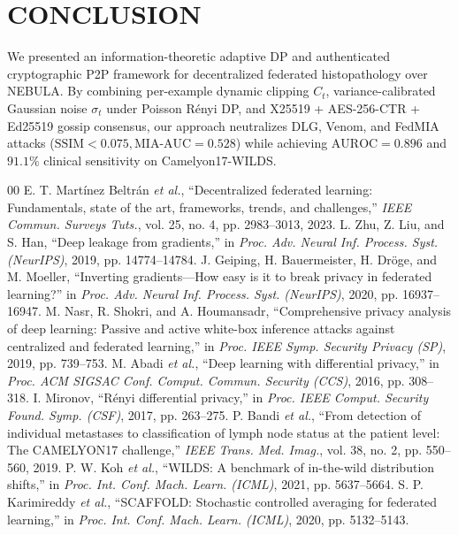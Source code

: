 \documentclass{ieeeaccess}
\begin{document}
\section{CONCLUSION}
We presented an information-theoretic adaptive DP and authenticated cryptographic P2P framework for decentralized federated histopathology over NEBULA. By combining per-example dynamic clipping $C_t$, variance-calibrated Gaussian noise $\sigma_t$ under Poisson R\'enyi DP, and X25519 + AES-256-CTR + Ed25519 gossip consensus, our approach neutralizes DLG, Venom, and FedMIA attacks ($\text{SSIM} < 0.075, \text{MIA-AUC} = 0.528$) while achieving $\text{AUROC} = 0.896$ and $91.1\%$ clinical sensitivity on Camelyon17-WILDS.

\begin{thebibliography}{00}
 E. T. Mart\'inez Beltr\'an \emph{et al.}, ``Decentralized federated learning: Fundamentals, state of the art, frameworks, trends, and challenges,'' \emph{IEEE Commun. Surveys Tuts.}, vol. 25, no. 4, pp. 2983--3013, 2023.
 L. Zhu, Z. Liu, and S. Han, ``Deep leakage from gradients,'' in \emph{Proc. Adv. Neural Inf. Process. Syst. (NeurIPS)}, 2019, pp. 14774--14784.
 J. Geiping, H. Bauermeister, H. Dr\"oge, and M. Moeller, ``Inverting gradients---How easy is it to break privacy in federated learning?'' in \emph{Proc. Adv. Neural Inf. Process. Syst. (NeurIPS)}, 2020, pp. 16937--16947.
 M. Nasr, R. Shokri, and A. Houmansadr, ``Comprehensive privacy analysis of deep learning: Passive and active white-box inference attacks against centralized and federated learning,'' in \emph{Proc. IEEE Symp. Security Privacy (SP)}, 2019, pp. 739--753.
 M. Abadi \emph{et al.}, ``Deep learning with differential privacy,'' in \emph{Proc. ACM SIGSAC Conf. Comput. Commun. Security (CCS)}, 2016, pp. 308--318.
 I. Mironov, ``R\'enyi differential privacy,'' in \emph{Proc. IEEE Comput. Security Found. Symp. (CSF)}, 2017, pp. 263--275.
 P. Bandi \emph{et al.}, ``From detection of individual metastases to classification of lymph node status at the patient level: The CAMELYON17 challenge,'' \emph{IEEE Trans. Med. Imag.}, vol. 38, no. 2, pp. 550--560, 2019.
 P. W. Koh \emph{et al.}, ``WILDS: A benchmark of in-the-wild distribution shifts,'' in \emph{Proc. Int. Conf. Mach. Learn. (ICML)}, 2021, pp. 5637--5664.
 S. P. Karimireddy \emph{et al.}, ``SCAFFOLD: Stochastic controlled averaging for federated learning,'' in \emph{Proc. Int. Conf. Mach. Learn. (ICML)}, 2020, pp. 5132--5143.

\end{thebibliography}
\end{document}
